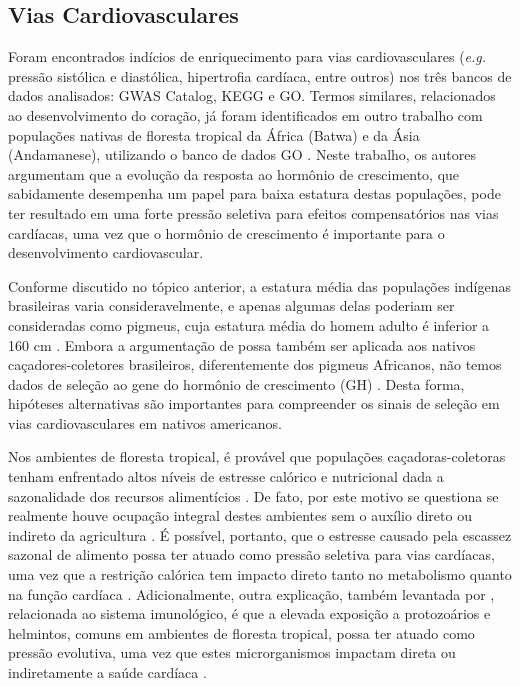 \subsection{Vias Cardiovasculares}

Foram encontrados indícios de enriquecimento para vias cardiovasculares (\emph{e.g.} pressão sistólica e diastólica, hipertrofia cardíaca, entre outros) nos três bancos de dados analisados: GWAS Catalog, KEGG e GO. Termos similares, relacionados ao desenvolvimento do coração, já foram identificados em outro trabalho com populações nativas de floresta tropical da África (Batwa) e da Ásia (Andamanese), utilizando o banco de dados GO \cite{bergey_polygenic_2018}. Neste trabalho, os autores argumentam que a evolução da resposta ao hormônio de crescimento, que sabidamente desempenha um papel para baixa estatura destas populações, pode ter resultado em uma forte pressão seletiva para efeitos compensatórios nas vias cardíacas, uma vez que o hormônio de crescimento é importante para o desenvolvimento cardiovascular.

Conforme discutido no tópico anterior, a estatura média das populações indígenas brasileiras varia consideravelmente, e apenas algumas delas poderiam ser consideradas como pigmeus, cuja estatura média do homem adulto é inferior a 160 cm \cite{cavalli-sforza_african_1986}. Embora a argumentação de  possa também ser aplicada aos nativos caçadores-coletores brasileiros, diferentemente dos pigmeus Africanos, não temos dados de seleção ao gene do hormônio de crescimento (GH) \cite{becker_role_2013}. Desta forma, hipóteses alternativas são importantes para compreender os sinais de seleção em vias cardiovasculares em nativos americanos.

Nos ambientes de floresta tropical, é provável que populações caçadoras-coletoras tenham enfrentado altos níveis de estresse calórico e nutricional dada a sazonalidade dos recursos alimentícios \cite{perry_evolution_2009}. De fato, por este motivo se questiona se realmente houve ocupação integral destes ambientes sem o auxílio direto ou indireto da agricultura \cite{bailey_hunting_1989}. É possível, portanto, que o estresse causado pela escassez sazonal de alimento possa ter atuado como pressão seletiva para vias cardíacas, uma vez que a restrição calórica tem impacto direto tanto no metabolismo quanto na função cardíaca \cite{han_caloric_2004,albakri_nutritional_2019}. Adicionalmente, outra explicação, também levantada por , relacionada ao sistema imunológico, é que a elevada exposição a protozoários e helmintos, comuns em ambientes de floresta tropical, possa ter atuado como pressão evolutiva, uma vez que estes microrganismos impactam direta ou indiretamente a saúde cardíaca \cite{hidron_cardiac_2010}.

